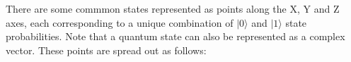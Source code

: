 There are some commmon states represented as points along the X, Y and Z axes, each corresponding to a unique combination of $|0\rangle$ and $|1\rangle$ state probabilities. Note that a quantum state can also be represented as a complex vector. These points are spread out as follows: 




